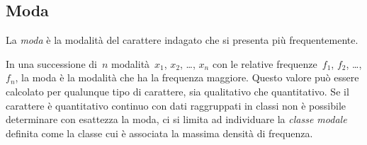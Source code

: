 \subsection{Moda}

\begin{definizione}
La \emph{moda} è la modalità del carattere indagato che si presenta più frequentemente.
\end{definizione}

In una successione di~$n$ modalità~$x_1$, $x_2$, \ldots, $x_n$
con le relative frequenze~$f_1$, $f_2$, \ldots, $f_n$, la moda è la modalità che ha la frequenza maggiore.
Questo valore può essere calcolato per qualunque tipo di carattere, sia qualitativo che quantitativo.
Se il carattere è quantitativo continuo con dati raggruppati in classi non è possibile determinare con esattezza la moda, ci si limita
ad individuare la \emph{classe modale} definita come la classe cui è associata la massima densità di frequenza.

